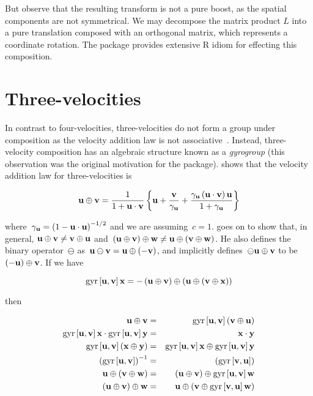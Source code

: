 \documentclass[ijoc,nonblindrev]{informs3} %
\begin{document}
But observe that the resulting transform is not a pure boost, as the
spatial components are not symmetrical.  We may decompose the matrix
product $L$ into a pure translation composed with an orthogonal
matrix, which represents a coordinate rotation.  The package provides
extensive R idiom for effecting this composition.

\section{Three-velocities}

In contrast to four-velocities, three-velocities do not form a group
under composition as the velocity addition law is not
associative~\citep{ungar2006}.  Instead, three-velocity composition
has an algebraic structure known as a {\em gyrogroup} (this
observation was the original motivation for the package).
\citeauthor{ungar2006} shows that the velocity addition law for
three-velocities is

\begin{equation}
\mathbf u\oplus\mathbf v= \frac{1}{1+\mathbf u\cdot\mathbf v} \left\{ \mathbf u +
\frac{\mathbf v}{\gamma_\mathbf u} + \frac{\gamma_\mathbf u
  \left(\mathbf u\cdot\mathbf v\right)\mathbf u}{1+\gamma_\mathbf u} \right\}
\end{equation}
   
where~$\gamma_\mathbf u=\left(1-\mathbf u\cdot\mathbf u\right)^{-1/2}$ and we are
assuming~$c=1$.  \citeauthor{ungar2006} goes on to show that, in
general, $\mathbf u\oplus\mathbf v\neq\mathbf v\oplus\mathbf u$
and~$(\mathbf u\oplus\mathbf v)\oplus\mathbf w\neq\mathbf u\oplus(\mathbf v\oplus\mathbf w)$.  He also
defines the binary operator~$\ominus$
as~$\mathbf u\ominus\mathbf v=\mathbf u\oplus\left(-\mathbf v\right)$, and implicitly
defines~$\ominus\mathbf u\oplus\mathbf v$ to be~$\left(-\mathbf u\right)\oplus\mathbf v$.  If
we have

\begin{equation}
\operatorname{gyr}\left[{\mathbf u},{\mathbf v}\right]\mathbf x=-\left(\mathbf u\oplus\mathbf v\right)\oplus\left(\mathbf u\oplus\left(\mathbf v\oplus\mathbf x\right)\right)
\end{equation}

then

\begin{eqnarray}
\mathbf u\oplus\mathbf v &=&
\operatorname{gyr}\left[{\mathbf u},{\mathbf v}\right]\left(\mathbf v\oplus\mathbf u\right)\label{noncom}\\ \operatorname{gyr}\left[{\mathbf u},{\mathbf v}\right]\mathbf x\cdot\operatorname{gyr}\left[{\mathbf u},{\mathbf v}\right]\mathbf y
&=& \mathbf x\cdot\mathbf y\label{doteq}\\ \operatorname{gyr}\left[{\mathbf u},{\mathbf v}\right]\left(\mathbf x\oplus\mathbf y\right) &=&
\operatorname{gyr}\left[{\mathbf u},{\mathbf v}\right]\mathbf x\oplus\operatorname{gyr}\left[{\mathbf u},{\mathbf v}\right]\mathbf y\\ \left(\operatorname{gyr}\left[{\mathbf u},{\mathbf v}\right]\right)^{-1} &=&
\left(\operatorname{gyr}\left[{\mathbf v},{\mathbf u}\right]\right)\label{gyrinv}\\ \mathbf u\oplus\left(\mathbf v\oplus\mathbf w\right)
&=&\left(\mathbf u\oplus\mathbf v\right)\oplus\operatorname{gyr}\left[{\mathbf u},{\mathbf v}\right]\mathbf w\label{nonass1}\\ \left(\mathbf u\oplus\mathbf v\right)\oplus\mathbf w
&=&\mathbf u\oplus\left(\mathbf v\oplus\operatorname{gyr}\left[{\mathbf v},{\mathbf u}\right]\mathbf w\right)\label{nonass2}
\end{eqnarray}
\end{document}
